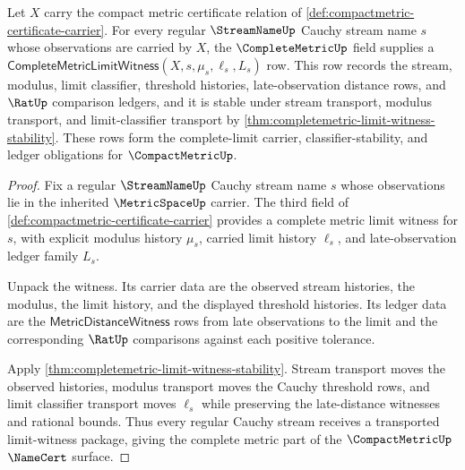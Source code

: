 \begin{theorem}
\label{thm:compactmetric-complete-limit-obligation}
Let $X$ carry the compact metric certificate relation of
\autoref{def:compactmetric-certificate-carrier}. For every regular
$\StreamNameUp$ Cauchy stream name $s$ whose observations are carried by
$X$, the $\CompleteMetricUp$ field supplies a
$\mathsf{CompleteMetricLimitWitness}(X,s,\mu_s,\ell_s,L_s)$ row. This row
records the stream, modulus, limit classifier, threshold histories,
late-observation distance rows, and $\RatUp$ comparison ledgers, and it is
stable under stream transport, modulus transport, and limit-classifier
transport by \autoref{thm:completemetric-limit-witness-stability}. These rows
form the complete-limit carrier, classifier-stability, and ledger obligations
for $\CompactMetricUp$.
\end{theorem}
\begin{proof}
Fix a regular $\StreamNameUp$ Cauchy stream name $s$ whose observations lie in
the inherited $\MetricSpaceUp$ carrier. The third field of
\autoref{def:compactmetric-certificate-carrier} provides a complete metric
limit witness for $s$, with explicit modulus history $\mu_s$, carried limit
history $\ell_s$, and late-observation ledger family $L_s$.

Unpack the witness. Its carrier data are the observed stream histories, the
modulus, the limit history, and the displayed threshold histories. Its ledger
data are the $\mathsf{MetricDistanceWitness}$ rows from late observations to
the limit and the corresponding $\RatUp$ comparisons against each positive
tolerance.

Apply \autoref{thm:completemetric-limit-witness-stability}. Stream transport
moves the observed histories, modulus transport moves the Cauchy threshold
rows, and limit classifier transport moves $\ell_s$ while preserving the
late-distance witnesses and rational bounds. Thus every regular Cauchy
stream receives a transported limit-witness package, giving the complete
metric part of the $\CompactMetricUp$ $\NameCert$ surface.
\end{proof}

